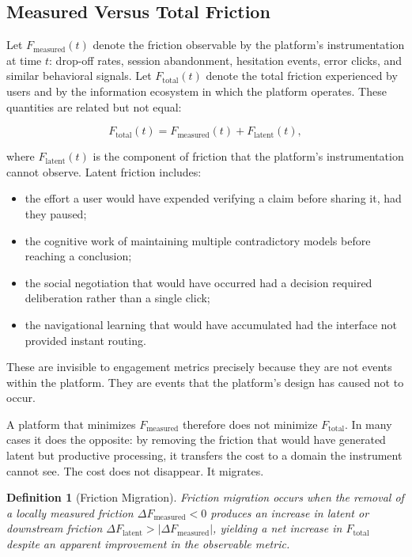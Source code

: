 \documentclass[11pt]{article}
\newtheorem{definition}{Definition}
\theoremstyle{remark}
\begin{document}
\subsection{Measured Versus Total Friction}

Let $F_{\text{measured}}(t)$ denote the friction observable by the platform's instrumentation at time $t$: drop-off rates, session abandonment, hesitation events, error clicks, and similar behavioral signals. Let $F_{\text{total}}(t)$ denote the total friction experienced by users and by the information ecosystem in which the platform operates. These quantities are related but not equal:

\[
F_{\text{total}}(t) = F_{\text{measured}}(t) + F_{\text{latent}}(t),
\]

where $F_{\text{latent}}(t)$ is the component of friction that the platform's instrumentation cannot observe. Latent friction includes:

\begin{itemize}[nosep]
  \item the effort a user would have expended verifying a claim before sharing it, had they paused;
  \item the cognitive work of maintaining multiple contradictory models before reaching a conclusion;
  \item the social negotiation that would have occurred had a decision required deliberation rather than a single click;
  \item the navigational learning that would have accumulated had the interface not provided instant routing.
\end{itemize}

These are invisible to engagement metrics precisely because they are not events within the platform. They are events that the platform's design has caused not to occur.

A platform that minimizes $F_{\text{measured}}$ therefore does not minimize $F_{\text{total}}$. In many cases it does the opposite: by removing the friction that would have generated latent but productive processing, it transfers the cost to a domain the instrument cannot see. The cost does not disappear. It migrates.

\begin{definition}[Friction Migration]
\label{def:friction_migration}
Friction migration occurs when the removal of a locally measured friction $\Delta F_{\text{measured}} < 0$ produces an increase in latent or downstream friction $\Delta F_{\text{latent}} > |\Delta F_{\text{measured}}|$, yielding a net increase in $F_{\text{total}}$ despite an apparent improvement in the observable metric.
\end{definition}
\end{document}
